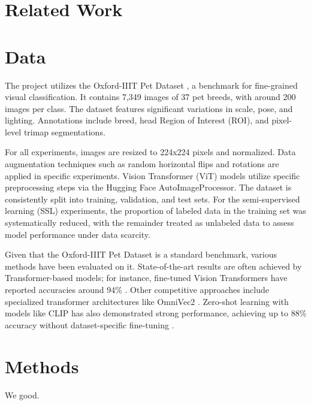 \documentclass{article}
\begin{document}
\section{Related Work}


\section{Data}
The project utilizes the Oxford-IIIT Pet Dataset \cite{Parkhi2012}, a benchmark for fine-grained visual classification. It contains 7,349 images of 37 pet breeds, with around 200 images per class. The dataset features significant variations in scale, pose, and lighting. Annotations include breed, head Region of Interest (ROI), and pixel-level trimap segmentations.

For all experiments, images are resized to 224x224 pixels and normalized. Data augmentation techniques such as random horizontal flips and rotations are applied in specific experiments. Vision Transformer (ViT) models utilize specific preprocessing steps via the Hugging Face AutoImageProcessor. The dataset is consistently split into training, validation, and test sets. For the semi-supervised learning (SSL) experiments, the proportion of labeled data in the training set was systematically reduced, with the remainder treated as unlabeled data to assess model performance under data scarcity.

Given that the Oxford-IIIT Pet Dataset is a standard benchmark, various methods have been evaluated on it. State-of-the-art results are often achieved by Transformer-based models; for instance, fine-tuned Vision Transformers have reported accuracies around 94\% \cite{HFNorburayViTPets}. Other competitive approaches include specialized transformer architectures like OmniVec2 \cite{Srivastava2024OmniVec2}. Zero-shot learning with models like CLIP has also demonstrated strong performance, achieving up to 88\% accuracy without dataset-specific fine-tuning \cite{HFMuellje3ViTPets}.



\section{Methods}
We good.


\end{document}
